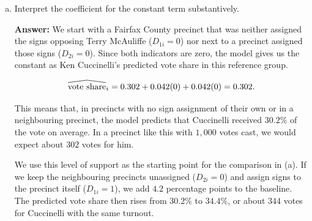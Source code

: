 \documentclass[12pt,letterpaper]{article}
\newcommand{\rcode}[2]{}
\newcommand{\answer}{\par\vspace{.18cm}\noindent\textbf{Answer:} }
\renewcommand{\widehat}[1]{\mathord{\tikz[baseline=(outcome.base)]{
  \node[inner sep=0pt,outer sep=0pt] (outcome) {$#1$};
  \draw[line width=.48pt,line join=round]
    ([yshift=1.1pt]outcome.north west) -- ([yshift=4pt]outcome.north) --
    ([yshift=1.1pt]outcome.north east);}}}
\begin{document}
\begin{enumerate}[(a)]
 $$H_0:\beta_{\mathrm{adjacent}}=0 \qquad H_A:\beta_{\mathrm{adjacent}}\ne 0$$

Using the standard error for adjacency and the same 128 residual degrees of freedom, we obtain:

$$t=\frac{0.042-0}{0.013}\approx 3.231,\qquad p=2\Pr(T_{128}\geq |3.231|)\approx 0.0016.$$

\rcode{78}{82}

\par\nobreak
{\setlength{\tabcolsep}{4pt}\renewcommand{\arraystretch}{0.93}%
\noindent{}\par}
\smallskip

Since $p\approx0.0016<0.05$, we reject $H_0$. Holding a precinct's own sign assignment fixed, the data provide statistically significant evidence that Cuccinelli's vote share was higher in precincts next to one assigned signs ($D_{2i}=1$) than in non-adjacent precincts ($D_{2i}=0$). The estimated difference is $4.2$ percentage points on average.

\newpage

\item Interpret the coefficient for the constant term substantively.

\answer We start with a Fairfax County precinct that was neither assigned the signs opposing Terry McAuliffe ($D_{1i}=0$) nor next to a precinct assigned those signs ($D_{2i}=0$). Since both indicators are zero, the model gives us the constant as Ken Cuccinelli's predicted vote share in this reference group.

$$\widehat{\text{vote share}}_i=0.302+0.042(0)+0.042(0)=0.302.$$

This means that, in precincts with no sign assignment of their own or in a neighbouring precinct, the model predicts that Cuccinelli received $30.2\%$ of the vote on average. In a precinct like this with $1{,}000$ votes cast, we would expect about $302$ votes for him.

We use this level of support as the starting point for the comparison in (a). If we keep the neighbouring precincts unassigned ($D_{2i}=0$) and assign signs to the precinct itself ($D_{1i}=1$), we add $4.2$ percentage points to the baseline. The predicted vote share then rises from $30.2\%$ to $34.4\%$, or about $344$ votes for Cuccinelli with the same turnout.


\end{enumerate}
\end{document}
